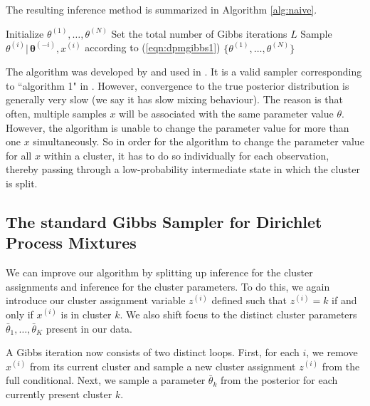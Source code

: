 \documentclass[final,3p,times,twocolumn]{elsarticle}
\let\bs\boldsymbol
\begin{document}
The resulting inference method is summarized in Algorithm \ref{alg:naive}.
\begin{algorithm}
\caption{Na{\"i}ve Gibbs sampler for DP mixtures}
\label{alg:naive}
\begin{algorithmic}[1]
\State Initialize $\theta^{(1)},\dots,\theta^{(N)}$
\State Set the total number of Gibbs iterations $L$
\State Sample $\theta^{(i)}|\,\bs\theta^{(-i)},x^{(i)}$ according to (\ref{eqn:dpmgibbs1})
\EndFor
\EndFor
\State\Return $\{\theta^{(1)},\dots,\theta^{(N)}\}$
\end{algorithmic}
\end{algorithm}

The algorithm was developed by \cite{escobar1994} and used in \cite{escobar1995}.
It is a valid sampler corresponding to ``algorithm 1" in \cite{neal2000}.
However, convergence to the true posterior distribution is generally very slow (we say it has slow mixing behaviour).
The reason is that often, multiple samples $x$ will be associated with the same parameter value $\theta$.
However, the algorithm is unable to change the parameter value for more than one $x$ simultaneously. 
So in order for the algorithm to change the parameter value for all $x$ within a cluster, it has to do so individually for each observation, thereby passing through a low-probability intermediate state in which the cluster is split.

\subsection{The standard Gibbs Sampler for Dirichlet Process Mixtures}
We can improve our algorithm by splitting up inference for the cluster assignments and inference for the cluster parameters.
To do this, we again introduce our cluster assignment variable $z^{(i)}$ defined such that $z^{(i)}=k$ if and only if $x^{(i)}$ is in cluster $k$.
We also shift focus to the distinct cluster parameters $\bar \theta_1,\dots,\bar \theta_K$ present in our data. 

A Gibbs iteration now consists of two distinct loops.
First, for each $i$, we remove $x^{(i)}$ from its current cluster and sample a new cluster assignment $z^{(i)}$ from the full conditional.
Next, we sample a parameter $\bar \theta_k$ from the posterior for each currently present cluster $k$.
\end{document}
